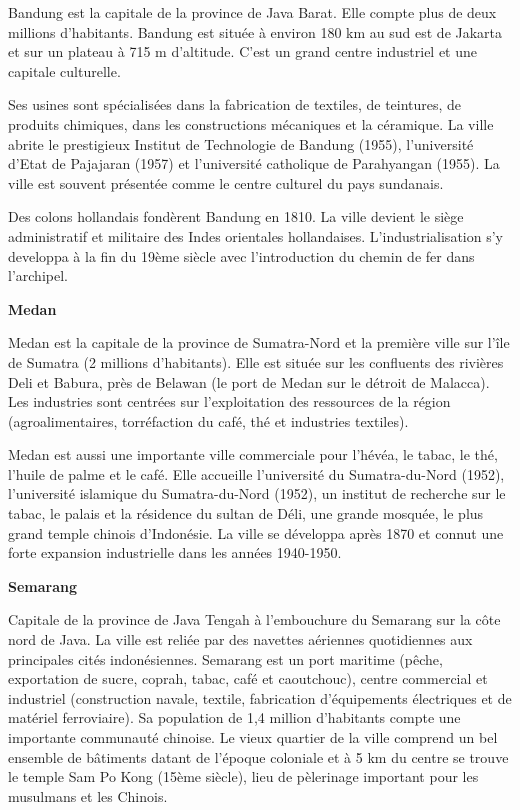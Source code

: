 Bandung est la capitale de la province de Java Barat. Elle compte plus de deux millions d'habitants. Bandung est située à environ 180 km au sud est de Jakarta et sur un plateau à 715 m d'altitude. C'est un grand centre industriel et une capitale culturelle.

Ses usines sont spécialisées dans la fabrication de textiles, de teintures, de produits chimiques, dans les constructions mécaniques et la céramique. La ville abrite le prestigieux Institut de Technologie de Bandung (1955), l'université d'Etat de Pajajaran (1957) et l'université catholique de Parahyangan (1955). La ville est souvent présentée comme le centre culturel du pays sundanais.

Des colons hollandais fondèrent Bandung en 1810. La ville devient le siège administratif et militaire des Indes orientales hollandaises. L'industrialisation s'y developpa à la fin du 19ème siècle avec l'introduction du chemin de fer dans l'archipel.

\textbf{Medan}

Medan est la capitale de la province de Sumatra-Nord et la première ville sur l'île de Sumatra (2 millions d'habitants). Elle est située sur les confluents des rivières Deli et Babura, près de Belawan (le port de Medan sur le détroit de Malacca). Les industries sont centrées sur l'exploitation des ressources de la région (agroalimentaires, torréfaction du café, thé et industries textiles).

Medan est aussi une importante ville commerciale pour l'hévéa, le tabac, le thé, l'huile de palme et le café. Elle accueille l'université du Sumatra-du-Nord (1952), l'université islamique du Sumatra-du-Nord (1952), un institut de recherche sur le tabac, le palais et la résidence du sultan de Déli, une grande mosquée, le plus grand temple chinois d'Indonésie. La ville se développa après 1870 et connut une forte expansion industrielle dans les années 1940-1950.

\textbf{Semarang}

Capitale de la province de Java Tengah à l'embouchure du Semarang sur la côte nord de Java. La ville est reliée par des navettes aériennes quotidiennes aux principales cités indonésiennes. Semarang est un port maritime (pêche, exportation de sucre, coprah, tabac, café et caoutchouc), centre commercial et industriel (construction navale, textile, fabrication d'équipements électriques et de matériel ferroviaire). Sa population de 1,4 million d'habitants compte une importante communauté chinoise. Le vieux quartier de la ville comprend un bel ensemble de bâtiments datant de l'époque coloniale et à 5 km du centre se trouve le temple Sam Po Kong (15ème siècle), lieu de pèlerinage important pour les musulmans et les Chinois.

